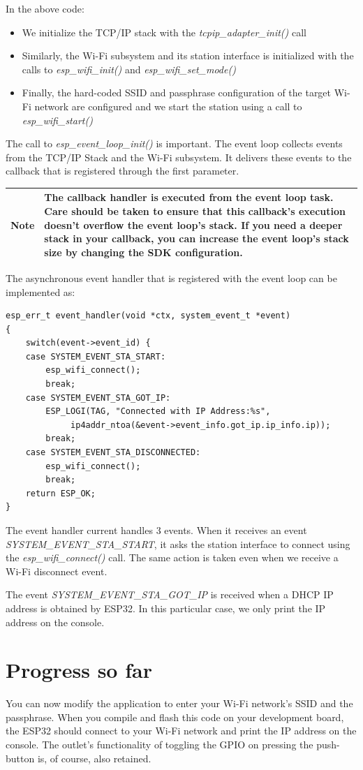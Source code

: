 \documentclass[11pt,fleqn]{book} %
\newcommand{\ksnotebox}[1]{\begin{tabularx}{\textwidth}{ |c|X| }
\hline
\cellcolor{lightgray} \textbf{Note} & #1 \\
\hline
\end{tabularx}} %
\begin{document}
In the above code:
\begin{itemize}
    \item We initialize the TCP/IP stack with the \textit{tcpip\_adapter\_init()} call
    \item Similarly, the Wi-Fi subsystem and its station interface is initialized with the calls to \textit{esp\_wifi\_init()} and \textit{esp\_wifi\_set\_mode()}
    \item Finally, the hard-coded SSID and passphrase configuration of the target Wi-Fi network are configured and we start the station using a call to \textit{esp\_wifi\_start()}
\end{itemize}

The call to \textit{esp\_event\_loop\_init()} is important. The event loop collects events from the TCP/IP Stack and the Wi-Fi subsystem. It delivers these events to the callback that is registered through the first parameter.

\ksnotebox{The callback handler is executed from the event loop task. Care should be taken to ensure that this callback's execution doesn't overflow the event loop's stack. If you need a deeper stack in your callback, you can increase the event loop's stack size by changing the SDK configuration.}

The asynchronous event handler that is registered with the event loop can be implemented as:
\begin{verbatim}
esp_err_t event_handler(void *ctx, system_event_t *event)
{
    switch(event->event_id) {
    case SYSTEM_EVENT_STA_START:
        esp_wifi_connect();
        break;
    case SYSTEM_EVENT_STA_GOT_IP:
        ESP_LOGI(TAG, "Connected with IP Address:%s",  
             ip4addr_ntoa(&event->event_info.got_ip.ip_info.ip));
        break;
    case SYSTEM_EVENT_STA_DISCONNECTED:
        esp_wifi_connect();
        break;
    return ESP_OK;
}
\end{verbatim}

The event handler current handles 3 events. When it receives an event \textit{SYSTEM\_EVENT\_STA\_START}, it asks the station interface to connect using the \textit{esp\_wifi\_connect()} call. The same action is taken even when we receive a Wi-Fi disconnect event.

The event \textit{SYSTEM\_EVENT\_STA\_GOT\_IP} is received when a DHCP IP address is obtained by ESP32. In this particular case, we  only print the IP address on the console.

\section{Progress so far}
You can now modify the application to enter your Wi-Fi network's SSID and the passphrase. When you compile and flash this code on your development board, the ESP32 should connect to your Wi-Fi network and print the IP address on the console. The outlet's functionality of toggling the GPIO on pressing the push-button is, of course, also retained.
\end{document}
